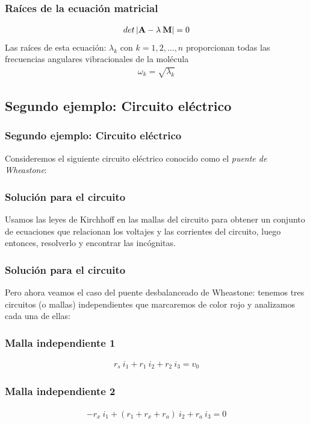 \begin{frame}
\frametitle{Raíces de la ecuación matricial}
\begin{align*}
det \, \abs{ \mathbf{A} - \lambda \: \mathbf{M} }= 0
\end{align*}
Las raíces de esta ecuación: $\lambda_{k}$ con $k = 1, 2, \ldots, n$ proporcionan todas las frecuencias angulares vibracionales de la molécula
\begin{align*}
\omega_{k} = \sqrt{\lambda_{k}}
\end{align*}
\end{frame}
\subsection{Segundo ejemplo: Circuito eléctrico}
\begin{frame}[fragile]
\frametitle{Segundo ejemplo: Circuito eléctrico}
Consideremos el siguiente circuito eléctrico conocido como el \emph{puente de Wheastone}:
\begin{figure}
	\centering
	
\end{figure}
\end{frame}
\begin{frame}
\frametitle{Solución para el circuito}
Usamos las leyes de Kirchhoff en las mallas del circuito para obtener un conjunto de ecuaciones que relacionan los voltajes y las corrientes del circuito, luego entonces, resolverlo y encontrar las incógnitas.
\end{frame}
\begin{frame}
\frametitle{Solución para el circuito}
Pero ahora veamos el caso del puente desbalanceado de Wheastone: tenemos tres circuitos (o mallas) independientes que marcaremos de color rojo y analizamos cada una de ellas:
\end{frame}
\begin{frame}[fragile]
\frametitle{Malla independiente 1}
\begin{figure}
	\centering
	
\end{figure}
\begin{align*}
r_{s} \: i_{1} + r_{1} \: i_{2} + r_{2} \: i_{3} = v_{0}
\end{align*}
\end{frame}
\begin{frame}[fragile]
\frametitle{Malla independiente 2}
\begin{figure}
	\centering
	
\end{figure}
\begin{align*}
-r_{x} \: i_{1} + ( r_{1} + r_{x} + r_{a}) \: i_{2} + r_{a} \: i_{3} = 0
\end{align*}
\end{frame}
